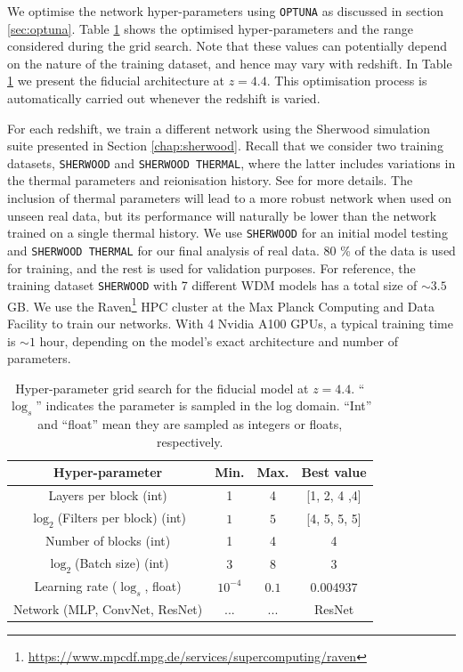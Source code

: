 We optimise the network hyper-parameters using \texttt{OPTUNA} as discussed in section \ref{sec:optuna}. Table \ref{table: fiducial architecture} shows the optimised hyper-parameters and the range considered during the grid search. Note that these values can potentially depend on the nature of the training dataset, and hence may vary with redshift. In Table \ref{table: fiducial architecture} we present the fiducial architecture at $z=4.4$. This optimisation process is automatically carried out whenever the redshift is varied.

For each redshift, we train a different network using the Sherwood simulation suite presented in Section \ref{chap:sherwood}. Recall that we consider two training datasets, \texttt{SHERWOOD} and \texttt{SHERWOOD THERMAL}, where the latter includes variations in the thermal parameters and reionisation history. See \cite{sherwood_wdm} for more details. The inclusion of thermal parameters will lead to a more robust network when used on unseen real data, but its performance will naturally be lower than the network trained on a single thermal history. We use \texttt{SHERWOOD} for an initial model testing and \texttt{SHERWOOD THERMAL} for our final analysis of real data. 80 \% of the data is used for training, and the rest is used for validation purposes. For reference, the training dataset \texttt{SHERWOOD} with 7 different WDM models has a total size of $\sim 3.5$ GB. We use the Raven\footnote{\url{https://www.mpcdf.mpg.de/services/supercomputing/raven}} HPC cluster at the Max Planck Computing and Data Facility to train our networks. With 4 Nvidia A100 GPUs, a typical training time is $\sim 1$ hour, depending on the model's exact architecture and number of parameters.


\begin{table}
    \centering
    \begin{tabular}{|c|c|c|c|}
        \hline
        Hyper-parameter&Min.  &Max.  &Best value \\
        \hline
        Layers per block (int)& 1 & 4 & [1, 2, 4 ,4] \\
        $\log_2$(Filters per block) (int)&$1$  &$5$  &  [4, 5, 5, 5] \\
        Number of blocks (int)&1  &4  &4 \\
        $\log_2$(Batch size) (int)&3  &8  & 3 \\
        Learning rate ($\log_s$, float)&$10^{-4}$  & $0.1$  &0.004937 \\ \hline
        Network (MLP, ConvNet, ResNet)&...  & ... &ResNet \\
        \hline
    \end{tabular}
    \caption{Hyper-parameter grid search for the fiducial model at $z=4.4$. ``$\log_s$'' indicates the parameter is sampled in the log domain. ``Int'' and ``float'' mean they are sampled as integers or floats, respectively.}
    \label{table: fiducial architecture}
\end{table}


